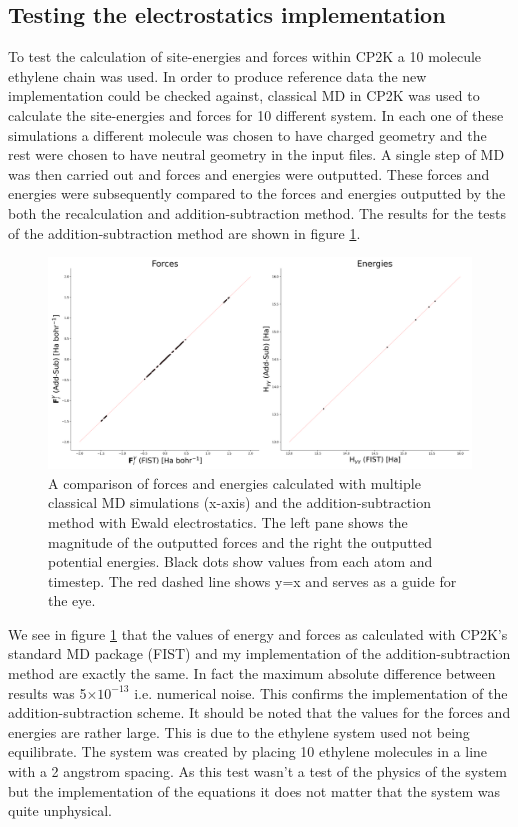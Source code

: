 \subsection{Testing the electrostatics implementation}
\label{sect:testESimp}
To test the calculation of site-energies and forces within CP2K a 10 molecule ethylene chain was used. In order to produce reference data the new implementation could be checked against, classical MD in CP2K was used to calculate the site-energies and forces for 10 different system. In each one of these simulations a different molecule was chosen to have charged geometry and the rest were chosen to have neutral geometry in the input files. A single step of MD was then carried out and forces and energies were outputted. These forces and energies were subsequently compared to the forces and energies outputted by the both the recalculation and addition-subtraction method. The results for the tests of the addition-subtraction method are shown in figure \ref{fig:AddSubEwaldTest}.
\begin{figure}[ht]
  \includegraphics[width=\textwidth]{./img/ES/10_mol_FIST.png}
  \caption{\label{fig:AddSubEwaldTest}A comparison of forces and energies calculated with multiple classical MD simulations (x-axis) and the addition-subtraction method with Ewald electrostatics. The left pane shows the magnitude of the outputted forces and the right the outputted potential energies. Black dots show values from each atom and timestep. The red dashed line shows y=x and serves as a guide for the eye.}
\end{figure}
We see in figure \ref{fig:AddSubEwaldTest} that the values of energy and forces as calculated with CP2K's standard MD package (FIST) and my implementation of the addition-subtraction method are exactly the same. In fact the maximum absolute difference between results was 5$\times 10^{-13}$ i.e. numerical noise. This confirms the implementation of the addition-subtraction scheme. It should be noted that the values for the forces and energies are rather large. This is due to the ethylene system used not being equilibrate. The system was created by placing 10 ethylene molecules in a line with a 2 angstrom spacing. As this test wasn't a test of the physics of the system but the implementation of the equations it does not matter that the system was quite unphysical.
